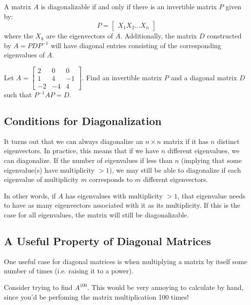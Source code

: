 \documentclass[11pt]{exam}
\begin{document}
    A matrix $A$ is diagonalizable if and only if there is an invertible matrix $P$ given by:
    $$P = \begin{bmatrix} X_1 X_2 \dots X_n \end{bmatrix}$$
    where the $X_k$ are the eigenvectors of $A$. Additionally, the matrix $D$ constructed by $A = PDP^{-1}$ will have diagonal
    entries consisting of the corresponding eigenvalues of $A$.

    \vspace{20px}
    \begin{questions}
        \item Let $A = \begin{bmatrix} 2 & 0 & 0 \\ 1 & 4 & -1 \\ -2 & -4 & 4 \end{bmatrix}$. Find an invertible matrix $P$ and a
        diagonal matrix $D$ such that $P^{-1}AP = D$.
    \end{questions}

    \vspace{20px}
    \subsection{Conditions for Diagonalization}
    It turns out that we can always diagonalize an $n \times n$ matrix if it has $n$ distinct eigenvectors.
    In practice, this means that if we have $n$ different eigenvalues, we can diagonalize. If the number of eigenvalues
    if less than $n$ (implying that some eigenvalue(s) have multiplicity $>1$), we may still be able to diagonalize if each
    eigenvalue of multiplicity $m$ corresponds to $m$ different eigenvectors.
    
    In other words, if $A$ has eigenvalues with multiplicity $> 1$, that eigenvalue needs to have as many eigenvectors associated with it
    as its multiplicity. If this is the case for all eigenvalues, the matrix will still be diagonalizable.

    \pagebreak
    \subsection{A Useful Property of Diagonal Matrices}
    One useful case for diagonal matrices is when multiplying a matrix by itself some number of times (i.e. raising it to a power).

    Consider trying to find $A^{100}$. This would be very annoying to calculate by hand, since you'd be perfoming the matrix multiplication 100 times!
\end{document}
